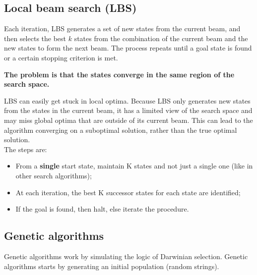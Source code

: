 \documentclass{article}
\begin{document}
\newpage

\subsection{Local beam search (LBS)}

Each iteration, LBS generates a set of new states from the current beam, and then selects the best $k$ states from the combination of the current beam and the new states to form the next beam. The process repeats until a goal state is found or a certain stopping criterion is met. \\

\begin{center}
\textbf{The problem is that the states converge in the same region of the search space.} \\     
\end{center}

LBS can easily get stuck in local optima. Because LBS only generates new states from the states in the current beam, it has a limited view of the search space and may miss global optima that are outside of its current beam. This can lead to the algorithm converging on a suboptimal solution, rather than the true optimal solution. \\

The steps are:

\begin{itemize}
    \item From a \textbf{single} start state, maintain K states and not just a single one (like in other search algorithms);
    \item At each iteration, the best K successor states for each state are identified;
    \item If the goal is found, then halt, else iterate the procedure.
\end{itemize}

\newpage

\subsection{Genetic algorithms}

\begin{flushleft}
Genetic algorithms work by simulating the logic of Darwinian selection.
Genetic algorithms starts by generating an initial population (random strings).     
\end{flushleft}
\end{document}
